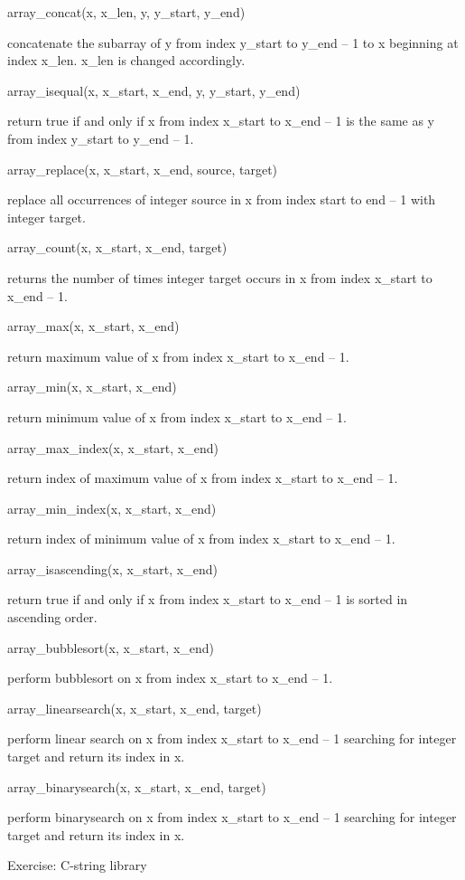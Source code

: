\documentclass[
]{article}
\begin{document}
array\_concat(x, x\_len, y, y\_start, y\_end)

concatenate the subarray of y from index y\_start to y\_end -- 1 to x
beginning at index x\_len. x\_len is changed accordingly.

array\_isequal(x, x\_start, x\_end, y, y\_start, y\_end)

return true if and only if x from index x\_start to x\_end -- 1 is the
same as y from index y\_start to y\_end -- 1.

array\_replace(x, x\_start, x\_end, source, target)

replace all occurrences of integer source in x from index start to end
-- 1 with integer target.

array\_count(x, x\_start, x\_end, target)

returns the number of times integer target occurs in x from index
x\_start to x\_end -- 1.

array\_max(x, x\_start, x\_end)

return maximum value of x from index x\_start to x\_end -- 1.

array\_min(x, x\_start, x\_end)

return minimum value of x from index x\_start to x\_end -- 1.

array\_max\_index(x, x\_start, x\_end)

return index of maximum value of x from index x\_start to x\_end -- 1.

array\_min\_index(x, x\_start, x\_end)

return index of minimum value of x from index x\_start to x\_end -- 1.

array\_isascending(x, x\_start, x\_end)

return true if and only if x from index x\_start to x\_end -- 1 is
sorted in ascending order.

array\_bubblesort(x, x\_start, x\_end)

perform bubblesort on x from index x\_start to x\_end -- 1.

array\_linearsearch(x, x\_start, x\_end, target)

perform linear search on x from index x\_start to x\_end -- 1 searching
for integer target and return its index in x.

array\_binarysearch(x, x\_start, x\_end, target)

perform binarysearch on x from index x\_start to x\_end -- 1 searching
for integer target and return its index in x.

Exercise: C-string library
\end{document}
